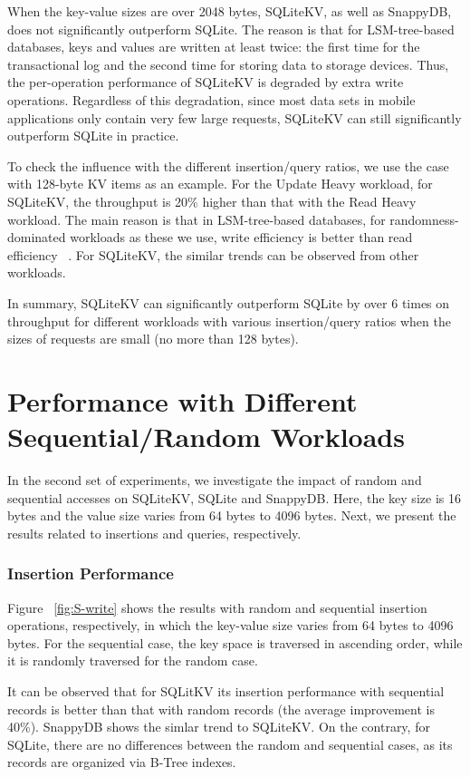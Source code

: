 When the key-value sizes are over 2048 bytes, SQLiteKV, as well as SnappyDB, does not significantly outperform SQLite. The reason is that for LSM-tree-based databases, keys and values are written at least twice: the first time for the transactional log and the second time for storing data to storage devices. Thus, the per-operation performance of SQLiteKV is degraded by extra write operations. Regardless of this degradation, since most data sets in mobile applications only contain very few large requests, SQLiteKV can still significantly outperform SQLite in practice.    

To check the influence with the different insertion/query ratios, we use the case with 128-byte KV items as an example. For the Update Heavy workload, for SQLiteKV, the throughput is 20\% higher than that with the Read Heavy workload. The main reason is that in LSM-tree-based databases, for randomness-dominated workloads as these we use, write efficiency is better than read efficiency ~\cite{sears2012blsm}. For SQLiteKV, the similar trends can be observed from other workloads. 

In summary, SQLiteKV can significantly outperform SQLite by over 6 times on throughput for different workloads with various insertion/query ratios when the sizes of requests are small (no more than 128 bytes).  



\section{Performance with Different Sequential/Random Workloads}
In the second set of experiments, we investigate the impact of random and sequential accesses on SQLiteKV, SQLite and SnappyDB. Here, the key size is 16 bytes and the value size varies from 64 bytes to 4096 bytes. Next, we present the results related to insertions and queries, respectively.  

\subsubsection{Insertion Performance}
Figure ~\ref{fig:S-write} shows the results with random and sequential insertion operations, respectively, in which the key-value size varies from 64 bytes to 4096 bytes. For the sequential case, the key space is traversed in ascending order, while it is randomly traversed for the random case. 

It can be observed that for SQLitKV its insertion performance with sequential records is better than that with random records (the average improvement is 40\%). SnappyDB shows the simlar trend to SQLiteKV. On the contrary, for SQLite, there are no differences between the random and sequential cases, as its records are organized via B-Tree indexes.      

